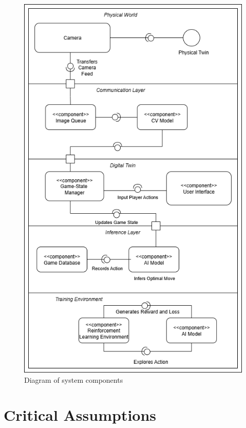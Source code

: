 \documentclass{article}
\begin{document}
\begin{figure}[H]
    \centering
    \includegraphics[width=\textwidth]{Component_Diagram_final.png}
    \caption{Diagram of system components}
    \label{fig:component-diagram}
\end{figure}

\section{Critical Assumptions}\label{sec:critical-assumptions}
\end{document}
